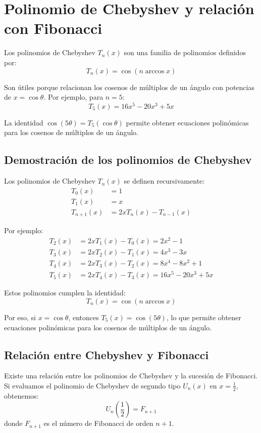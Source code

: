 \section*{Polinomio de Chebyshev y relación con Fibonacci}
Los polinomios de Chebyshev $T_n(x)$ son una familia de polinomios definidos por:
\begin{equation*}
T_n(x) = \cos(n \arccos x)
\end{equation*}

Son útiles porque relacionan los cosenos de múltiplos de un ángulo con potencias de $x = \cos \theta$. Por ejemplo, para $n=5$:
\begin{equation*}
T_5(x) = 16x^5 - 20x^3 + 5x
\end{equation*}

La identidad $\cos(5\theta) = T_5(\cos \theta)$ permite obtener ecuaciones polinómicas para los cosenos de múltiplos de un ángulo.

\subsection*{Demostración de los polinomios de Chebyshev}
Los polinomios de Chebyshev $T_n(x)$ se definen recursivamente:
\begin{align*}
T_0(x) &= 1 \\
T_1(x) &= x \\
T_{n+1}(x) &= 2x T_n(x) - T_{n-1}(x)
\end{align*}

Por ejemplo:
\begin{align*}
T_2(x) &= 2x T_1(x) - T_0(x) = 2x^2 - 1 \\
T_3(x) &= 2x T_2(x) - T_1(x) = 4x^3 - 3x \\
T_4(x) &= 2x T_3(x) - T_2(x) = 8x^4 - 8x^2 + 1 \\
T_5(x) &= 2x T_4(x) - T_3(x) = 16x^5 - 20x^3 + 5x
\end{align*}

Estos polinomios cumplen la identidad:
\begin{equation*}
T_n(x) = \cos(n \arccos x)
\end{equation*}

Por eso, si $x = \cos \theta$, entonces $T_5(x) = \cos(5\theta)$, lo que permite obtener ecuaciones polinómicas para los cosenos de múltiplos de un ángulo.

\subsection*{Relación entre Chebyshev y Fibonacci}
Existe una relación entre los polinomios de Chebyshev y la sucesión de Fibonacci. Si evaluamos el polinomio de Chebyshev de segundo tipo $U_n(x)$ en $x = \frac{1}{2}$, obtenemos:
\begin{equation*}
U_n\left(\frac{1}{2}\right) = F_{n+1}
\end{equation*}
donde $F_{n+1}$ es el número de Fibonacci de orden $n+1$.

